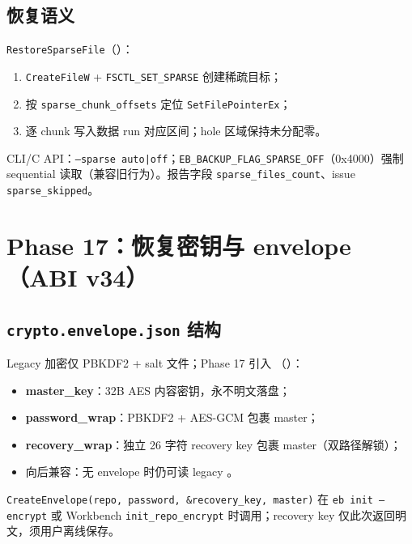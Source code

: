 \subsection{恢复语义}

\texttt{RestoreSparseFile}（）：
\begin{enumerate}[nosep]
  \item \texttt{CreateFileW} + \texttt{FSCTL\_SET\_SPARSE} 创建稀疏目标；
  \item 按 \texttt{sparse\_chunk\_offsets} 定位 \texttt{SetFilePointerEx}；
  \item 逐 chunk 写入数据 run 对应区间；hole 区域保持未分配零。
\end{enumerate}

CLI/C API：\texttt{--sparse auto|off}；\texttt{EB\_BACKUP\_FLAG\_SPARSE\_OFF}（0x4000）强制 sequential 读取（兼容旧行为）。报告字段 \texttt{sparse\_files\_count}、issue \texttt{sparse\_skipped}。

\section{Phase 17：恢复密钥与 envelope（ABI v34）}
\label{sec:phase17-envelope}

\subsection{\texttt{crypto.envelope.json} 结构}

Legacy 加密仅 PBKDF2 + salt 文件；Phase 17 引入 （）：

\begin{structbox}[Envelope 语义]
\begin{itemize}[nosep]
  \item \textbf{master\_key}：32B AES 内容密钥，永不明文落盘；
  \item \textbf{password\_wrap}：PBKDF2 + AES-GCM 包裹 master；
  \item \textbf{recovery\_wrap}：独立 26 字符 recovery key 包裹 master（双路径解锁）；
  \item 向后兼容：无 envelope 时仍可读 legacy 。
\end{itemize}
\end{structbox}

\texttt{CreateEnvelope(repo, password, \&recovery\_key, master)} 在 \texttt{eb init --encrypt} 或 Workbench \texttt{init\_repo\_encrypt} 时调用；recovery key 仅此次返回明文，须用户离线保存。

